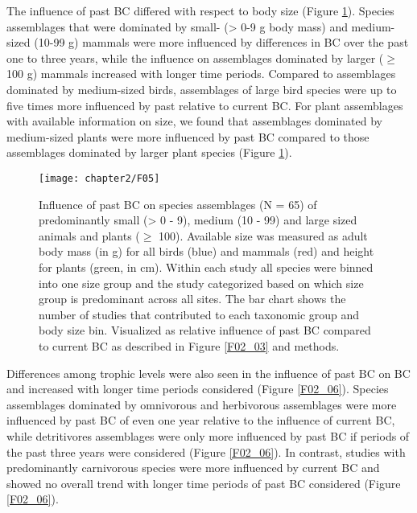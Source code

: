The influence of past BC differed with respect to body size (Figure \ref{F02_05}). Species assemblages that were dominated by small- (> 0-9 g body mass) and medium-sized (10-99 g) mammals were more influenced by differences in BC over the past one to three years, while the influence on assemblages dominated by larger ($\geq$ 100 g) mammals increased with longer time periods. Compared to assemblages dominated by medium-sized birds, assemblages of large bird species were up to five times more influenced by past relative to current BC. For plant assemblages with available information on size, we found that assemblages dominated by medium-sized plants were more influenced by past BC compared to those assemblages dominated by larger plant species (Figure \ref{F02_05}). 
\begin{figure}[h]
\centering
\texttt{[image: chapter2/F05]}
\caption{Influence of past BC on species assemblages (N = 65) of predominantly small (> 0 - 9), medium (10 - 99) and large sized animals and plants ($\geq$ 100). Available size was measured as adult body mass (in g) for all birds (blue) and mammals (red) and height for plants (green, in cm). Within each study all species were binned into one size group and the study categorized based on which size group is predominant across all sites. The bar chart shows the number of studies that contributed to each taxonomic group and body size bin. Visualized as relative influence of past BC compared to current BC as described in Figure \ref{F02_03} and methods.}
\label{F02_05}
\end{figure}
Differences among trophic levels were also seen in the influence of past BC on BC and increased with longer time periods considered (Figure \ref{F02_06}). Species assemblages dominated by omnivorous and herbivorous assemblages were more influenced by past BC of even one year relative to the influence of current BC, while detritivores assemblages were only more influenced by past BC if periods of the past three years were considered (Figure \ref{F02_06}). In contrast, studies with predominantly carnivorous species were more influenced by current BC and showed no overall trend with longer time periods of past BC considered (Figure \ref{F02_06}). 
